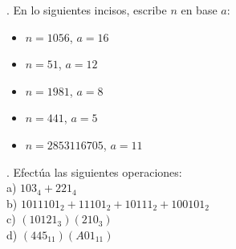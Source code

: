 \documentclass[letterpaper]{article}
\renewcommand{\*}{\cdot}
\theoremstyle{definition}
\begin{document}
. En lo siguientes incisos, escribe $ n $ en base $ a $:\\
\begin{itemize}
	\item $ n = 1056 $, $ a = 16 $
	\item $ n = 51 $, $ a = 12 $
	\item $ n = 1981$, $ a = 8 $
	\item $ n = 441$, $ a = 5 $
	\item $ n = 2853116705$, $ a = 11 $
\end{itemize}

. Efectúa las siguientes operaciones:\\
a) $ 103_4 + 221_4 $\\
b) $ 1011101_2 + 11101_2 + 10111_2 + 100101_2 $\\
c) $ (10121_3)(210_3) $\\
d) $ (445_11)(A01_11) $
\end{document}
